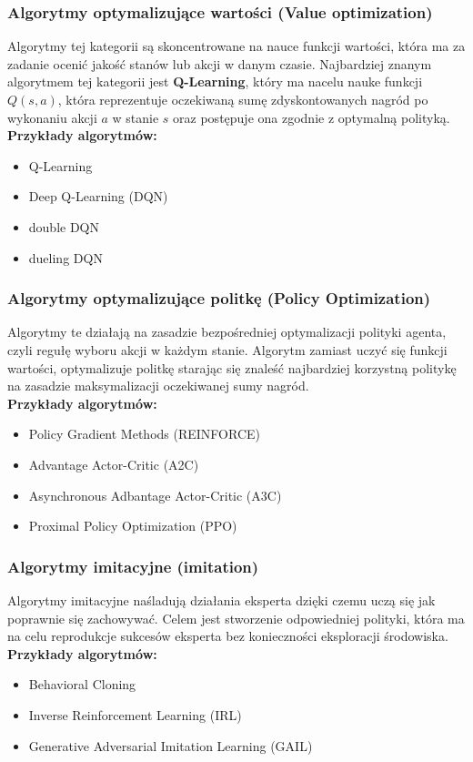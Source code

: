 \documentclass[a4paper, 10pt]{article}
\begin{document}
    \subsubsection{Algorytmy optymalizujące wartości (Value optimization)}
    Algorytmy tej kategorii są skoncentrowane na nauce funkcji wartości, która ma za zadanie ocenić jakość stanów lub akcji w danym czasie.
    Najbardziej znanym algorytmem tej kategorii jest \textbf{Q-Learning}, który ma nacelu nauke funkcji \textbf{\( Q(s,a) \)}, 
    która reprezentuje oczekiwaną sumę zdyskontowanych nagród po wykonaniu akcji \( a \) w stanie \( s \) oraz postępuje ona zgodnie z optymalną polityką.
    \\ \textbf{Przykłady algorytmów:}
    \begin{itemize}
        \item Q-Learning
        \item Deep Q-Learning (DQN)
        \item double DQN
        \item dueling DQN
    \end{itemize}
    \subsubsection{Algorytmy optymalizujące politkę (Policy Optimization)}
    Algorytmy te działają na zasadzie bezpośredniej optymalizacji polityki agenta, czyli regułę wyboru akcji w każdym stanie.
    Algorytm zamiast uczyć się funkcji wartości, optymalizuje politkę starając się znaleść najbardziej korzystną politykę na zasadzie maksymalizacji
    oczekiwanej sumy nagród.
    \\ \textbf{Przykłady algorytmów:}
    \begin{itemize}
        \item Policy Gradient Methods (REINFORCE)
        \item Advantage Actor-Critic (A2C)
        \item Asynchronous Adbantage Actor-Critic (A3C)
        \item Proximal Policy Optimization (PPO)
    \end{itemize}
    \subsubsection{Algorytmy imitacyjne (imitation)}
    Algorytmy imitacyjne naśladują działania eksperta dzięki czemu uczą się jak poprawnie się zachowywać. Celem jest
    stworzenie odpowiedniej polityki, która ma na celu reprodukcje sukcesów eksperta bez konieczności eksploracji środowiska.
    \\ \textbf{Przykłady algorytmów:}
    \begin{itemize}
        \item Behavioral Cloning
        \item Inverse Reinforcement Learning (IRL)
        \item Generative Adversarial Imitation Learning (GAIL)
    \end{itemize}
\end{document}
